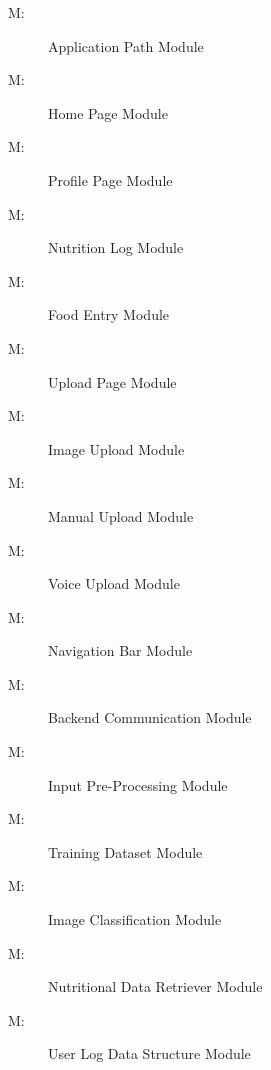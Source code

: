 \documentclass[12pt, titlepage]{article}
\newcounter{mnum}
\newcommand{\mthemnum}{M\themnum}
\begin{document}
\begin{description}
\item [ \mthemnum \label{mAP}:] Application Path Module
\item  [ \mthemnum \label{mHP}:] Home Page Module
\item  [ \mthemnum \label{mPP}:] Profile Page Module
\item  [ \mthemnum \label{mNL}:] Nutrition Log Module
\item  [ \mthemnum \label{mFE}:] Food Entry Module
\item  [ \mthemnum \label{mUP}:] Upload Page Module
\item  [ \mthemnum \label{mIU}:] Image Upload Module
\item  [ \mthemnum \label{mMU}:] Manual Upload Module
\item  [ \mthemnum \label{mVU}:] Voice Upload Module
\item  [ \mthemnum \label{mNB}:] Navigation Bar Module
\item  [ \mthemnum \label{mBC}:] Backend Communication Module
\item  [ \mthemnum \label{mIP}:] Input Pre-Processing Module
\item  [ \mthemnum \label{mTD}:] Training Dataset Module
\item  [ \mthemnum \label{mIC}:] Image Classification Module
\item  [ \mthemnum \label{mNDR}:] Nutritional Data Retriever Module
\item  [ \mthemnum \label{mULD}:] User Log Data Structure Module
\end{description}
\end{document}
